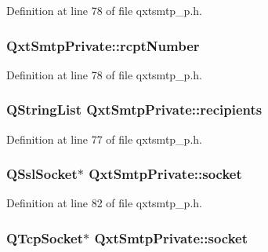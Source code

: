 Definition at line 78 of file qxtsmtp\-\_\-p.\-h.

\hypertarget{class_qxt_smtp_private_a1ce9fc169e62f6c50f3b7a91b4632b0d}{
\subsubsection[{rcpt\-Number}]{ Qxt\-Smtp\-Private\-::rcpt\-Number}}\label{class_qxt_smtp_private_a1ce9fc169e62f6c50f3b7a91b4632b0d}


Definition at line 78 of file qxtsmtp\-\_\-p.\-h.

\hypertarget{class_qxt_smtp_private_a648c87072234df4dd567e616f258782b}{
\subsubsection[{recipients}]{\setlength{\rightskip}{0pt plus 5cm}Q\-String\-List Qxt\-Smtp\-Private\-::recipients}}\label{class_qxt_smtp_private_a648c87072234df4dd567e616f258782b}


Definition at line 77 of file qxtsmtp\-\_\-p.\-h.

\hypertarget{class_qxt_smtp_private_af17220495be77a43fd34228ab7bef36e}{
\subsubsection[{socket}]{\setlength{\rightskip}{0pt plus 5cm}Q\-Ssl\-Socket$\ast$ Qxt\-Smtp\-Private\-::socket}}\label{class_qxt_smtp_private_af17220495be77a43fd34228ab7bef36e}


Definition at line 82 of file qxtsmtp\-\_\-p.\-h.

\hypertarget{class_qxt_smtp_private_a38fdddc6a7ebac21cc8ada0b6079664d}{
\subsubsection[{socket}]{\setlength{\rightskip}{0pt plus 5cm}Q\-Tcp\-Socket$\ast$ Qxt\-Smtp\-Private\-::socket}}\label{class_qxt_smtp_private_a38fdddc6a7ebac21cc8ada0b6079664d}


